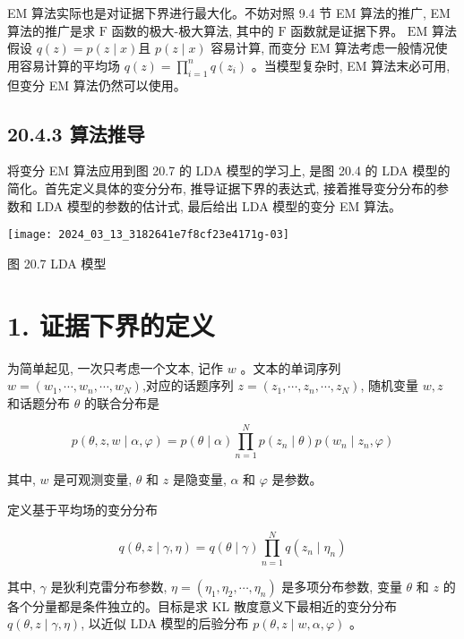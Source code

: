 \documentclass[10pt]{article}
\begin{document}
\begin{CJK*}{UTF8}{bsmi}
EM 算法实际也是对证据下界进行最大化。不妨对照 9.4 节 EM 算法的推广, EM 算法的推广是求 $\mathrm{F}$ 函数的极大-极大算法, 其中的 $\mathrm{F}$ 函数就是证据下界。 $\mathrm{EM}$ 算法假设 $q(z)=p(z \mid x)$且 $p(z \mid x)$ 容易计算, 而变分 $\mathrm{EM}$ 算法考虑一般情况使用容易计算的平均场 $q(z)=\prod_{i=1}^{n} q\left(z_{i}\right)$ 。当模型复杂时, EM 算法末必可用, 但变分 EM 算法仍然可以使用。

\subsection*{20.4.3 算法推导}
将变分 EM 算法应用到图 20.7 的 LDA 模型的学习上, 是图 20.4 的 LDA 模型的简化。首先定义具体的变分分布, 推导证据下界的表达式, 接着推导变分分布的参数和 LDA 模型的参数的估计式, 最后给出 LDA 模型的变分 EM 算法。

\begin{center}
\texttt{[image: 2024\_03\_13\_3182641e7f8cf23e4171g-03]}
\end{center}

图 20.7 LDA 模型

\section*{1. 证据下界的定义}
为简单起见, 一次只考虑一个文本, 记作 $w$ 。文本的单词序列 $w=\left(w_{1}, \cdots, w_{n}, \cdots, w_{N}\right)$,对应的话题序列 $z=\left(z_{1}, \cdots, z_{n}, \cdots, z_{N}\right)$, 随机变量 $w, z$ 和话题分布 $\theta$ 的联合分布是


\begin{equation*}
p(\theta, z, w \mid \alpha, \varphi)=p(\theta \mid \alpha) \prod_{n=1}^{N} p\left(z_{n} \mid \theta\right) p\left(w_{n} \mid z_{n}, \varphi\right) \tag{20.42}
\end{equation*}


其中, $w$ 是可观测变量, $\theta$ 和 $z$ 是隐变量, $\alpha$ 和 $\varphi$ 是参数。

定义基于平均场的变分分布


\begin{equation*}
q(\theta, z \mid \gamma, \eta)=q(\theta \mid \gamma) \prod_{n=1}^{N} q\left(z_{n} \mid \eta_{n}\right) \tag{20.43}
\end{equation*}


其中, $\gamma$ 是狄利克雷分布参数, $\eta=\left(\eta_{1}, \eta_{2}, \cdots, \eta_{n}\right)$ 是多项分布参数, 变量 $\theta$ 和 $z$ 的各个分量都是条件独立的。目标是求 KL 散度意义下最相近的变分分布 $q(\theta, z \mid \gamma, \eta)$, 以近似 LDA 模型的后验分布 $p(\theta, z \mid w, \alpha, \varphi)$ 。


\end{CJK*}
\end{document}
